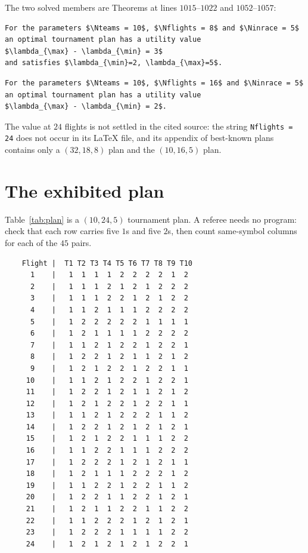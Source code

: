 \documentclass[11pt]{amsart}
\theoremstyle{remark}
\begin{document}
The two solved members are Theorems at lines $1015$--$1022$ and $1052$--$1057$:
\begingroup\footnotesize
\begin{verbatim}
For the parameters $\Nteams = 10$, $\Nflights = 8$ and $\Ninrace = 5$
an optimal tournament plan has a utility value
$\lambda_{\max} - \lambda_{\min} = 3$
and satisfies $\lambda_{\min}=2, \lambda_{\max}=5$.
\end{verbatim}
\endgroup
\begingroup\footnotesize
\begin{verbatim}
For the parameters $\Nteams = 10$, $\Nflights = 16$ and $\Ninrace = 5$
an optimal tournament plan has a utility value
$\lambda_{\max} - \lambda_{\min} = 2$.
\end{verbatim}
\endgroup
The value at $24$ flights is not settled in the cited source: the string
\verb|Nflights = 24| does not occur in its \LaTeX{} file, and its appendix of
best-known plans contains only a $(32,18,8)$ plan and the $(10,16,5)$ plan.

\section{The exhibited plan}\label{sec:object}

Table~\ref{tab:plan} is a $(10,24,5)$ tournament plan. A referee needs no
program: check that each row carries five $1$s and five $2$s, then count
same-symbol columns for each of the $45$ pairs.

\begin{table}[ht]
\caption{A tournament plan for $N_{\mathrm{teams}}=10$,
$N_{\mathrm{flights}}=24$, $N_{\mathrm{inrace}}=5$ with
$\lambda_{\max}-\lambda_{\min}=2$.}
\label{tab:plan}
\begin{verbatim}
    Flight |  T1 T2 T3 T4 T5 T6 T7 T8 T9 T10
      1    |   1  1  1  1  2  2  2  2  1  2
      2    |   1  1  1  2  1  2  1  2  2  2
      3    |   1  1  1  2  2  1  2  1  2  2
      4    |   1  1  2  1  1  1  2  2  2  2
      5    |   1  2  2  2  2  2  1  1  1  1
      6    |   1  2  1  1  1  1  2  2  2  2
      7    |   1  1  2  1  2  2  1  2  2  1
      8    |   1  2  2  1  2  1  1  2  1  2
      9    |   1  2  1  2  2  1  2  2  1  1
     10    |   1  1  2  1  2  2  1  2  2  1
     11    |   1  2  2  1  2  1  1  2  1  2
     12    |   1  2  1  2  2  1  2  2  1  1
     13    |   1  1  2  1  2  2  2  1  1  2
     14    |   1  2  2  1  2  1  2  1  2  1
     15    |   1  2  1  2  2  1  1  1  2  2
     16    |   1  1  2  2  1  1  1  2  2  2
     17    |   1  2  2  2  1  2  1  2  1  1
     18    |   1  2  1  1  1  2  2  2  1  2
     19    |   1  1  2  2  1  2  2  1  1  2
     20    |   1  2  2  1  1  2  2  1  2  1
     21    |   1  2  1  1  2  2  1  1  2  2
     22    |   1  1  2  2  2  1  2  1  2  1
     23    |   1  2  2  2  1  1  1  1  2  2
     24    |   1  2  1  2  1  2  1  2  2  1
\end{verbatim}
\end{table}
\end{document}
